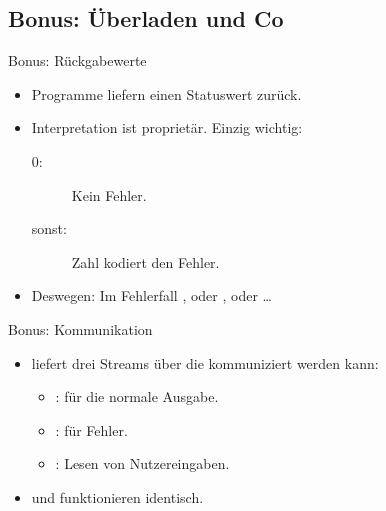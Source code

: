 \subsection{Bonus: Überladen und Co}

\begin{frame}[t,fragile]{Bonus: Rückgabewerte}
    \begin{itemize}[<+(1)->]
        \item Programme liefern einen Statuswert zurück.
        \item Interpretation ist proprietär. Einzig wichtig: \begin{description}
            \item[0:] Kein Fehler.
            \item[sonst:] Zahl kodiert den Fehler.
        \end{description}
        \item Deswegen: Im Fehlerfall ,\pause{} oder ,\pause{} oder \ldots
    \end{itemize}
\end{frame}

\begin{frame}[t,fragile]{Bonus: Kommunikation}
    \begin{itemize}[<+(1)->]
        \item {} liefert drei Streams\pause{} über die kommuniziert werden kann: \begin{itemize}
            \item {}: für die normale Ausgabe.
            \item {}: für Fehler.
            \item {}: Lesen von Nutzereingaben.
        \end{itemize}
        \item {} und  funktionieren identisch.
    \end{itemize}
\end{frame}

